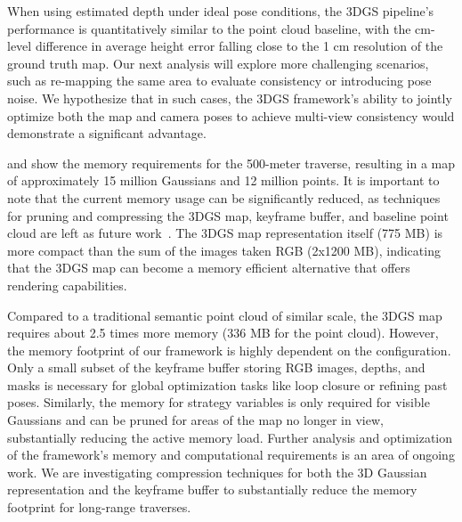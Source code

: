 When using estimated depth under ideal pose conditions, the 3DGS pipeline's performance is quantitatively similar to the point cloud baseline, with the cm-level difference in average height error falling close to the 1 cm resolution of the ground truth map. Our next analysis will explore more challenging scenarios, such as re-mapping the same area to evaluate consistency or introducing pose noise. We hypothesize that in such cases, the 3DGS framework's ability to jointly optimize both the map and camera poses to achieve multi-view consistency would demonstrate a significant advantage.

 and  show the memory requirements for the 500-meter traverse, resulting in a map of approximately 15 million Gaussians and 12 million points. It is important to note that the current memory usage can be significantly reduced, as techniques for pruning and compressing the 3DGS map, keyframe buffer, and baseline point cloud are left as future work~\cite{bagdasarian_3dgszip_2025}. The 3DGS map representation itself (775 MB) is more compact than the sum of the images taken RGB (2x1200 MB), indicating that the 3DGS map can become a memory efficient alternative that offers rendering capabilities.

Compared to a traditional semantic point cloud of similar scale, the 3DGS map requires about 2.5 times more memory (336 MB for the point cloud). However, the memory footprint of our framework is highly dependent on the configuration. Only a small subset of the keyframe buffer storing RGB images, depths, and masks is necessary for global optimization tasks like loop closure or refining past poses.
Similarly, the memory for strategy variables is only required for visible Gaussians and can be pruned for areas of the map no longer in view, substantially reducing the active memory load.
Further analysis and optimization of the framework's memory and computational requirements is an area of ongoing work. We are investigating compression techniques for both the 3D Gaussian representation and the keyframe buffer to substantially reduce the memory footprint for long-range traverses.



